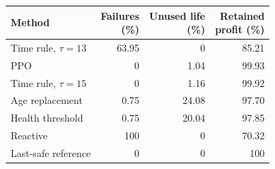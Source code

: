 {\footnotesize\setlength{\tabcolsep}{3pt}\renewcommand{\arraystretch}{1.08}%
\begin{tabular}{@{}lrrr@{}}
\toprule
Method & \shortstack{Failures\\(\%)} & \shortstack{Unused life\\(\%)} & \shortstack{Retained\\profit (\%)}\\
\midrule
Time rule, $\tau=13$ & 63.95 & 0 & 85.21\\
PPO & 0 & 1.04 & 99.93\\
Time rule, $\tau=15$ & 0 & 1.16 & 99.92\\
\midrule
Age replacement & 0.75 & 24.08 & 97.70\\
Health threshold & 0.75 & 20.04 & 97.85\\
Reactive & 100 & 0 & 70.32\\
\midrule
Last-safe reference & 0 & 0 & 100\\
\bottomrule
\end{tabular}}
